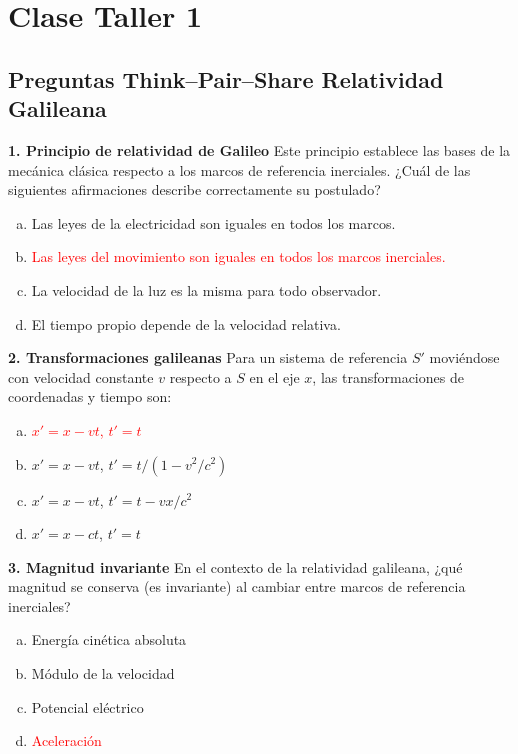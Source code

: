 \chapter{Clase Taller 1}

\section{Preguntas Think--Pair--Share Relatividad Galileana}

\textbf{1. Principio de relatividad de Galileo}
Este principio establece las bases de la mecánica clásica respecto a los marcos de referencia inerciales. ¿Cuál de las siguientes afirmaciones describe correctamente su postulado?
\begin{enumerate}[a)]
    \item Las leyes de la electricidad son iguales en todos los marcos.
    \item \textcolor{red}{Las leyes del movimiento son iguales en todos los marcos inerciales.}
    \item La velocidad de la luz es la misma para todo observador.
    \item El tiempo propio depende de la velocidad relativa.
\end{enumerate}

\textbf{2. Transformaciones galileanas}
Para un sistema de referencia $S'$ moviéndose con velocidad constante $v$ respecto a $S$ en el eje $x$, las transformaciones de coordenadas y tiempo son:
\begin{enumerate}[a)]
    \item \textcolor{red}{$x' = x - vt$, $t' = t$}
    \item $x' = x - vt$, $t' = t/(1 - v^2/c^2)$
    \item $x' = x - vt$, $t' = t - vx/c^2$
    \item $x' = x - ct$, $t' = t$
\end{enumerate}

\textbf{3. Magnitud invariante}
En el contexto de la relatividad galileana, ¿qué magnitud se conserva (es invariante) al cambiar entre marcos de referencia inerciales?
\begin{enumerate}[a)]
    \item Energía cinética absoluta
    \item Módulo de la velocidad
    \item Potencial eléctrico
    \item \textcolor{red}{Aceleración}
\end{enumerate}


